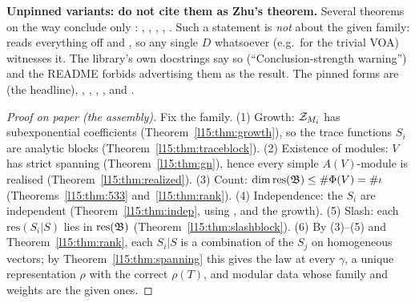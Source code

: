 \begin{warning}
\textbf{Unpinned variants: do not cite them as Zhu's theorem.} Several theorems on the way conclude only
: , ,
\allowbreak{}, \allowbreak{},
\allowbreak{}. Such a statement is \emph{not} about the given family: 
reads everything off  and , so any single $D$ whatsoever (e.g.\ for the trivial VOA) witnesses it.
The library's own docstrings say so (``Conclusion-strength warning'') and the README forbids advertising them as the result.
The pinned forms are \allowbreak{}\allowbreak{} (the headline),
\allowbreak{}\allowbreak{}, \allowbreak{}\allowbreak{},
\allowbreak{}\allowbreak{}, \allowbreak{}, \allowbreak{}
and \allowbreak{}.
\end{warning}

\begin{proof}[Proof on paper (the assembly)]
Fix the family. (1) Growth: $\mathcal{Z}_{M_i}$ has subexponential coefficients (Theorem~\ref{l15:thm:growth}), so the trace
functions $S_i$ are analytic blocks (Theorem~\ref{l15:thm:traceblock}). (2) Existence of modules: $V$ has strict spanning
(Theorem~\ref{l15:thm:gn}), hence every simple $A(V)$-module is realised (Theorem~\ref{l15:thm:realized}). (3) Count:
$\dim\mathrm{res}(\mathfrak{B})\le\#\Phi(V)=\#\iota$ (Theorems~\ref{l15:thm:533} and~\ref{l15:thm:rank}). (4) Independence: the
$S_i$ are independent (Theorem~\ref{l15:thm:indep}, using ,  and the growth). (5) Slash: each
$\mathrm{res}(S_i|S)$ lies in $\mathrm{res}(\mathfrak{B})$ (Theorem~\ref{l15:thm:slashblock}). (6) By (3)--(5) and
Theorem~\ref{l15:thm:rank}, each $S_i|S$ is a combination of the $S_j$ on homogeneous vectors; by Theorem~\ref{l15:thm:spanning}
this gives the law at every $\gamma$, a unique representation $\rho$ with the correct $\rho(T)$, and modular data whose
family and weights are the given ones.
\end{proof}

